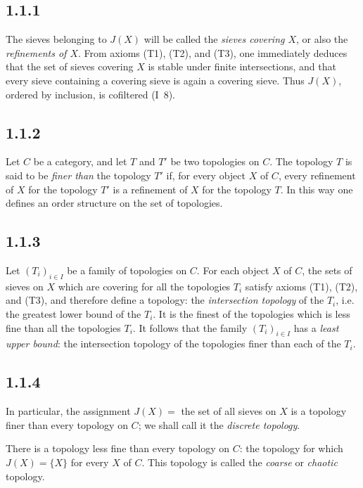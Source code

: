\documentclass[11pt]{article}
\begin{document}
\subsection*{1.1.1}
The sieves belonging to \(J(X)\) will be called the \emph{sieves covering \(X\)}, or also the \emph{refinements of \(X\)}. From axioms (T1), (T2), and (T3), one immediately deduces that the set of sieves covering \(X\) is stable under finite intersections, and that every sieve containing a covering sieve is again a covering sieve. Thus \(J(X)\), ordered by inclusion, is cofiltered (I~8).

\subsection*{1.1.2}
Let \(C\) be a category, and let \(T\) and \(T'\) be two topologies on \(C\). The topology \(T\) is said to be \emph{finer than} the topology \(T'\) if, for every object \(X\) of \(C\), every refinement of \(X\) for the topology \(T'\) is a refinement of \(X\) for the topology \(T\). In this way one defines an order structure on the set of topologies.

\subsection*{1.1.3}
Let \((T_i)_{i\in I}\) be a family of topologies on \(C\). For each object \(X\) of \(C\), the sets of sieves on \(X\) which are covering for all the topologies \(T_i\) satisfy axioms (T1), (T2), and (T3), and therefore define a topology: the \emph{intersection topology} of the \(T_i\), i.e. the greatest lower bound of the \(T_i\). It is the finest of the topologies which is less fine than all the topologies \(T_i\). It follows that the family \((T_i)_{i\in I}\) has a \emph{least upper bound}: the intersection topology of the topologies finer than each of the \(T_i\).

\subsection*{1.1.4}
In particular, the assignment \(J(X)=\) the set of all sieves on \(X\) is a topology finer than every topology on \(C\); we shall call it the \emph{discrete topology}.

There is a topology less fine than every topology on \(C\): the topology for which \(J(X)=\{X\}\) for every \(X\) of \(C\). This topology is called the \emph{coarse} or \emph{chaotic} topology.
\end{document}
